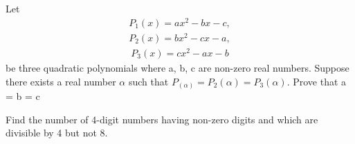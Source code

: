 \item Let 
\begin{align*}
P_1(x) = ax^2 - bx - c,
\end{align*}
\begin{align*}
P_2(x) = bx^2 - cx - a,
\end{align*}
\begin{align*} 
P_3(x) = cx^2 - ax - b
\end{align*}
be three quadratic polynomials where a, b, c are non-zero real numbers. Suppose there exists a real number 
$\alpha$ such that $P_(\alpha) = P_2(\alpha)= P_3(\alpha)$. Prove that a = b = c

\item Find the number of 4-digit numbers  having non-zero digits and which are divisible by 4 but not 8.
 